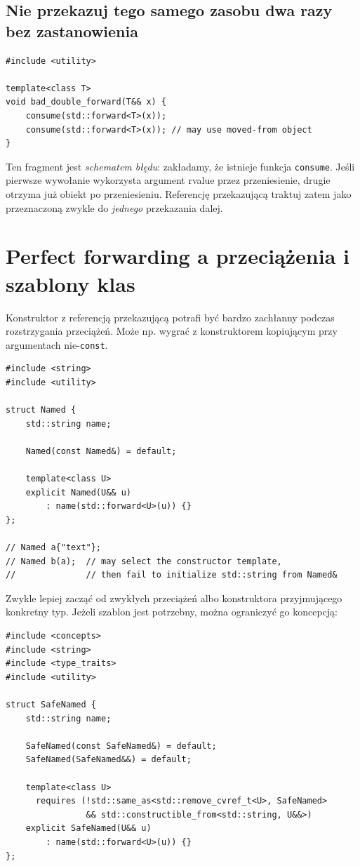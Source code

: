 \subsection{Nie przekazuj tego samego zasobu dwa razy bez zastanowienia}

\begin{lstlisting}
#include <utility>

template<class T>
void bad_double_forward(T&& x) {
    consume(std::forward<T>(x));
    consume(std::forward<T>(x)); // may use moved-from object
}
\end{lstlisting}

Ten fragment jest \emph{schematem błędu}: zakładamy, że istnieje
funkcja \texttt{consume}. Jeśli pierwsze wywołanie wykorzysta
argument rvalue przez przeniesienie, drugie otrzyma już obiekt
po przeniesieniu. Referencję przekazującą traktuj zatem jako
przeznaczoną zwykle do \emph{jednego} przekazania dalej.

\section{Perfect forwarding a przeciążenia i szablony klas}

Konstruktor z referencją przekazującą potrafi być bardzo zachłanny
podczas rozstrzygania przeciążeń. Może np. wygrać z konstruktorem
kopiującym przy argumentach nie-\texttt{const}.

\begin{lstlisting}
#include <string>
#include <utility>

struct Named {
    std::string name;

    Named(const Named&) = default;

    template<class U>
    explicit Named(U&& u)
        : name(std::forward<U>(u)) {}
};

// Named a{"text"};
// Named b(a);  // may select the constructor template,
//              // then fail to initialize std::string from Named&
\end{lstlisting}

Zwykle lepiej zacząć od zwykłych przeciążeń albo konstruktora
przyjmującego konkretny typ. Jeżeli szablon jest potrzebny,
można ograniczyć go koncepcją:

\begin{lstlisting}
#include <concepts>
#include <string>
#include <type_traits>
#include <utility>

struct SafeNamed {
    std::string name;

    SafeNamed(const SafeNamed&) = default;
    SafeNamed(SafeNamed&&) = default;

    template<class U>
      requires (!std::same_as<std::remove_cvref_t<U>, SafeNamed>
                && std::constructible_from<std::string, U&&>)
    explicit SafeNamed(U&& u)
        : name(std::forward<U>(u)) {}
};
\end{lstlisting}

